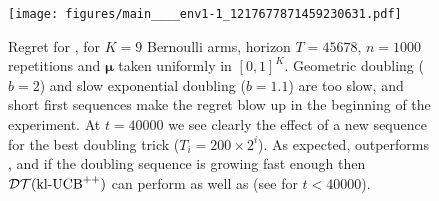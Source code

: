 \documentclass[12pt]{colt2018} %
\begin{document}


%
%
\begin{figure}[H]
    \centering
    \texttt{[image: figures/main\_\_\_\_env1-1\_1217677871459230631.pdf]}
    \caption{Regret for \DT, for $K=9$ Bernoulli arms, horizon $T=45678$, $n=1000$ repetitions and $\boldsymbol{\mu}$ taken uniformly in $[0,1]^K$. Geometric doubling ($b=2$) and slow exponential doubling ($b=1.1$) are too slow, and short first sequences make the regret blow up in the beginning of the experiment. At $t=40000$ we see clearly the effect of a new sequence for the best doubling trick ($T_i = 200 \times 2^i$). As expected, \KLUCBpp{} outperforms \KLUCB, and if the doubling sequence is growing fast enough then $\mathcal{DT}(\mathrm{kl}\text{-}\mathrm{UCB}^{++})$ can perform as well as \KLUCB{} (see for $t < 40000$).}
    \label{fig:bernoulliBandits_DoublingTrick_Restart_BayesianProblem}
\end{figure}
\end{document}
